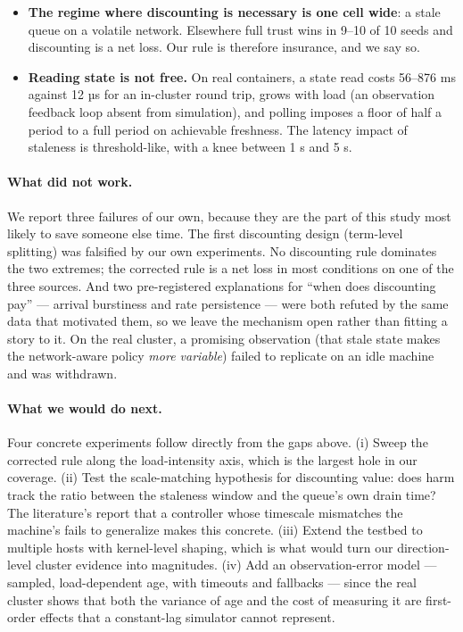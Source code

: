 \begin{itemize}
        channel retains $90$--$99\%$ of the benefit under a 60 s-old link snapshot,
        where uniform and threshold discounting destroy all of it.
  \item \textbf{The regime where discounting is necessary is one cell wide}: a stale queue on a
        volatile network. Elsewhere full trust wins in 9--10 of 10 seeds and discounting is a net
        loss. Our rule is therefore insurance, and we say so.
  \item \textbf{Reading state is not free.} On real containers, a state read costs
        56--876 ms against 12 µs for an in-cluster round
        trip, grows with load (an observation feedback loop absent from simulation), and polling
        imposes a floor of half a period to a full period on achievable freshness. The latency
        impact of staleness is threshold-like, with a knee between 1 s and
        5 s.
\end{itemize}

\paragraph{What did not work.}
We report three failures of our own, because they are the part of this study most likely to save
someone else time. The first discounting design (term-level splitting) was falsified by our own
experiments. No discounting rule dominates the two extremes; the corrected rule is a net loss in
most conditions on one of the three sources. And two pre-registered explanations for ``when does
discounting pay'' --- arrival burstiness and rate persistence --- were both refuted by the same
data that motivated them, so we leave the mechanism open rather than fitting a story to it. On
the real cluster, a promising observation (that stale state makes the network-aware policy
\emph{more variable}) failed to replicate on an idle machine and was withdrawn.

\paragraph{What we would do next.}
Four concrete experiments follow directly from the gaps above. (i) Sweep the corrected rule along
the load-intensity axis, which is the largest hole in our coverage. (ii) Test the scale-matching
hypothesis for discounting value: does harm track the ratio between the staleness window and the
queue's own drain time? The literature's report that a controller whose timescale mismatches the
machine's fails to generalize \cite{dlfp} makes this concrete. (iii) Extend the testbed to
multiple hosts with kernel-level shaping, which is what would turn our direction-level cluster
evidence into magnitudes. (iv) Add an observation-error model --- sampled, load-dependent age,
with timeouts and fallbacks --- since the real cluster shows that both the variance of age and
the cost of measuring it are first-order effects that a constant-lag simulator cannot represent.

